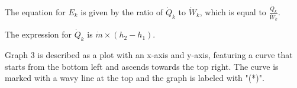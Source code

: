 The equation for \( E_k \) is given by the ratio of \( \dot{Q}_k \) to \( \dot{W}_k \), which is equal to \( \frac{\dot{Q}_k}{\dot{W}_k} \).

The expression for \( \dot{Q}_k \) is \( \dot{m} \times (h_2 - h_1) \).

Graph 3 is described as a plot with an x-axis and y-axis, featuring a curve that starts from the bottom left and ascends towards the top right. The curve is marked with a wavy line at the top and the graph is labeled with "(*)".